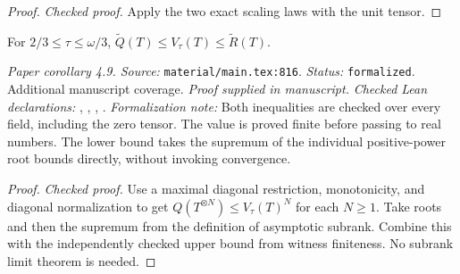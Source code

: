 \begin{proof}
\leanok
{}
\textit{Checked proof.} Apply the two exact scaling laws with the unit tensor.
\end{proof}

\renewcommand{\thetheorem}{4.9}
\begin{corollary}
\label{lem:rank-value}
\manuscriptproof
{}
\leanok
{}
For $2/3\le\tau\le\omega/3$, $\widetilde Q(T)\le V_\tau(T)\le\widetilde R(T)$.
\end{corollary}

\noindent\textit{Paper corollary 4.9. Source:} \texttt{material/main.tex:816}.
\textit{Status:} \texttt{formalized}. Additional manuscript coverage.
\textit{Proof supplied in manuscript.}
\textit{Checked Lean declarations:} , , , .
\textit{Formalization note:} Both inequalities are checked over every field, including the zero tensor. The value is proved finite before passing to real numbers. The lower bound takes the supremum of the individual positive-power root bounds directly, without invoking convergence.

\begin{proof}
\leanok
{}
\textit{Checked proof.} Use a maximal diagonal restriction, monotonicity, and diagonal normalization to get $Q(T^{\otimes N})\le V_\tau(T)^N$ for each $N\ge1$. Take roots and then the supremum from the definition of asymptotic subrank. Combine this with the independently checked upper bound from witness finiteness. No subrank limit theorem is needed.
\end{proof}

